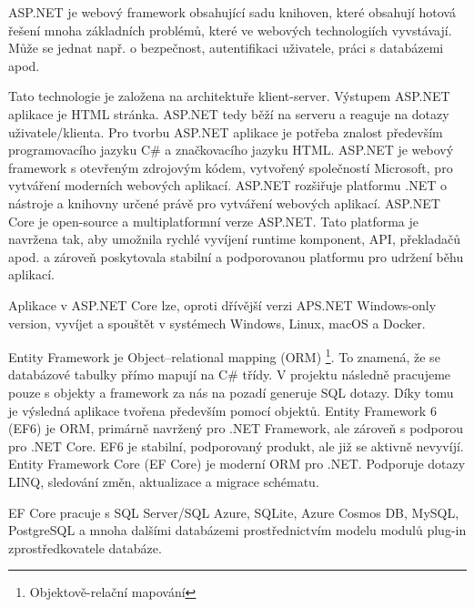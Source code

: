 \documentclass[a4paper, 12pt]{report}
\begin{document}
			ASP.NET je webový framework obsahující sadu knihoven, které obsahují hotová řešení mnoha základních problémů, které ve webových technologiích vyvstávají. Může se jednat např. o bezpečnost, autentifikaci uživatele, práci s databázemi apod.\par
			Tato technologie je založena na architektuře klient-server. Výstupem ASP.NET aplikace je HTML stránka. ASP.NET tedy běží na serveru a reaguje na dotazy uživatele/klienta. Pro tvorbu ASP.NET aplikace je potřeba znalost především programovacího jazyku C\# a značkovacího jazyku HTML.
			\cite{ASP.NET_Lekce1}
				ASP.NET je webový framework s otevřeným zdrojovým kódem, vytvořený společností Microsoft, pro vytváření moderních webových aplikací. ASP.NET rozšiřuje platformu .NET o nástroje a knihovny určené právě pro vytváření webových aplikací.
				\cite{ASP.NET}
				ASP.NET Core je open-source a multiplatformní verze ASP.NET. Tato platforma je navržena tak, aby umožnila rychlé vyvíjení runtime komponent, API, překladačů apod. a zároveň poskytovala stabilní a podporovanou platformu pro udržení běhu aplikací.\par
				Aplikace v ASP.NET Core lze, oproti dřívější verzi APS.NET Windows-only version, vyvíjet a spouštět v systémech Windows, Linux, macOS a Docker.
				\cite{ASP.NET_Core}

			Entity Framework je Object–relational mapping (ORM) \footnote{Objektově-relační mapování}. To znamená, že se databázové tabulky přímo mapují na C\# třídy. V projektu následně pracujeme pouze s objekty a framework za nás na pozadí generuje SQL dotazy. Díky tomu je výsledná aplikace tvořena především pomocí objektů.
			\cite{ASP.NET_Lekce8}
				Entity Framework 6 (EF6) je ORM, primárně navržený pro .NET Framework, ale zároveň s podporou pro .NET Core. EF6 je stabilní, podporovaný produkt, ale již se aktivně nevyvíjí.
				\cite{EF6_EFCore}
				Entity Framework Core (EF Core) je moderní ORM pro .NET. Podporuje dotazy LINQ, sledování změn, aktualizace a migrace schématu.\par
				EF Core pracuje s SQL Server/SQL Azure, SQLite, Azure Cosmos DB, MySQL, PostgreSQL a mnoha dalšími databázemi prostřednictvím modelu modulů plug-in zprostředkovatele databáze.
				\cite{EF6_EFCore}
\end{document}
